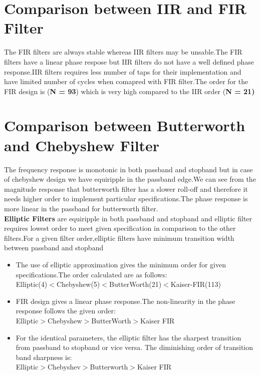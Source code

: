 \documentclass[12pt]{article}
\begin{document}
\section{\textbf{Comparison between IIR and FIR Filter}}
The FIR filters are always stable whereas IIR filters may be unsable.The FIR filters have a linear phase respose but IIR filters do not have a well defined phase response.IIR filters requires less number of taps for their implementation and have limited number of cycles when comapred with FIR filter.The order for the FIR design is (\textbf{N = 93}) which is very high compared to the IIR order (\textbf{N = 21)}
\section{\textbf{Comparison between Butterworth and Chebyshew Filter}}
The frequency response is monotonic in both passband and stopband but in case of chebyshew design we have equiripple in the passband edge.We can see from the magnitude response that butterworth filter has a slower roll-off and therefore it needs higher order to implement particular specifications.The phase response is more linear in the passband for butterworth filter.
\\
\textbf{Elliptic Filters} are equiripple in both passband and stopband and elliptic filter requires lowest order to meet given specification in comparison to the other filters.For a given filter order,elliptic filters have minimum transition width between passband and stopband\\
\begin{itemize}
    \item The use of elliptic approximation gives the minimum order for given specifications.The order calculated are as follows:\\
    Elliptic(4)$<$Chebyshew(5)$<$ButterWorth(21)$<$Kaiser-FIR(113)
    \item FIR design gives a linear phase response.The non-linearity in the phase response follows the given order:\\
    Elliptic$>$Chebyshew$>$ButterWorth$>$Kaiser FIR
    \item  For the identical parameters, the elliptic filter has the sharpest transition from
    passband to stopband or vice versa. The diminishing order of transition band sharpness is:\\
    Elliptic$>$Chebyshev$>$Butterworth$>$Kaiser FIR
\end{itemize}
\end{document}
